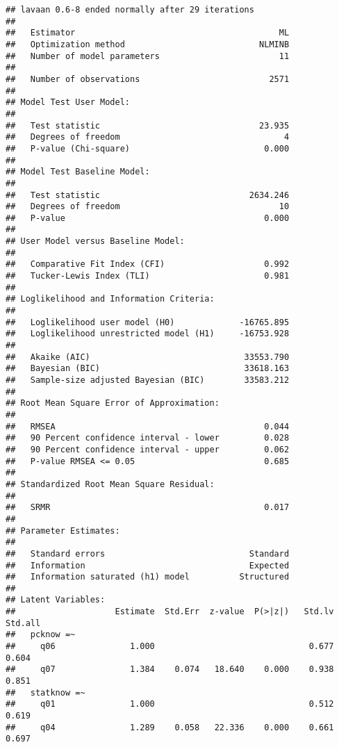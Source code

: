 \documentclass[
]{article}
\begin{document}
\begin{verbatim}
## lavaan 0.6-8 ended normally after 29 iterations
## 
##   Estimator                                         ML
##   Optimization method                           NLMINB
##   Number of model parameters                        11
##                                                       
##   Number of observations                          2571
##                                                       
## Model Test User Model:
##                                                       
##   Test statistic                                23.935
##   Degrees of freedom                                 4
##   P-value (Chi-square)                           0.000
## 
## Model Test Baseline Model:
## 
##   Test statistic                              2634.246
##   Degrees of freedom                                10
##   P-value                                        0.000
## 
## User Model versus Baseline Model:
## 
##   Comparative Fit Index (CFI)                    0.992
##   Tucker-Lewis Index (TLI)                       0.981
## 
## Loglikelihood and Information Criteria:
## 
##   Loglikelihood user model (H0)             -16765.895
##   Loglikelihood unrestricted model (H1)     -16753.928
##                                                       
##   Akaike (AIC)                               33553.790
##   Bayesian (BIC)                             33618.163
##   Sample-size adjusted Bayesian (BIC)        33583.212
## 
## Root Mean Square Error of Approximation:
## 
##   RMSEA                                          0.044
##   90 Percent confidence interval - lower         0.028
##   90 Percent confidence interval - upper         0.062
##   P-value RMSEA <= 0.05                          0.685
## 
## Standardized Root Mean Square Residual:
## 
##   SRMR                                           0.017
## 
## Parameter Estimates:
## 
##   Standard errors                             Standard
##   Information                                 Expected
##   Information saturated (h1) model          Structured
## 
## Latent Variables:
##                    Estimate  Std.Err  z-value  P(>|z|)   Std.lv  Std.all
##   pcknow =~                                                             
##     q06               1.000                               0.677    0.604
##     q07               1.384    0.074   18.640    0.000    0.938    0.851
##   statknow =~                                                           
##     q01               1.000                               0.512    0.619
##     q04               1.289    0.058   22.336    0.000    0.661    0.697

\end{verbatim}
\end{document}

